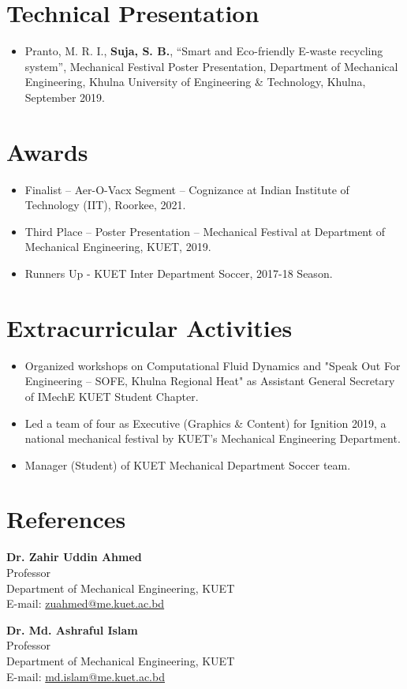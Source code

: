 \documentclass[letterpaper,11pt]{article}
\begin{document}
\section{Technical Presentation}
\begin{itemize}
\item Pranto, M. R. I., \textbf{Suja, S. B.}, “Smart and Eco-friendly E-waste recycling system”, Mechanical Festival Poster Presentation, Department of Mechanical Engineering, Khulna University of Engineering \& Technology, Khulna, September 2019.
\end{itemize}

\section{Awards}
\begin{itemize}
\item Finalist – Aer-O-Vacx Segment – Cognizance at Indian Institute of Technology (IIT), Roorkee, 2021.
\item Third Place – Poster Presentation – Mechanical Festival at Department of Mechanical Engineering, KUET, 2019.
\item Runners Up - KUET Inter Department Soccer, 2017-18 Season.
\end{itemize}

\section{Extracurricular Activities}
\begin{itemize}
\item Organized workshops on Computational Fluid Dynamics and "Speak Out For Engineering – SOFE, Khulna Regional Heat" as Assistant General Secretary of IMechE KUET Student Chapter.
\item Led a team of four as Executive (Graphics \& Content) for Ignition 2019, a national mechanical festival by KUET's Mechanical Engineering Department.
\item Manager (Student) of KUET Mechanical Department Soccer team.
\end{itemize}

\section{References}
\begin{minipage}[t]{0.45\textwidth}
\textbf{Dr. Zahir Uddin Ahmed} \\
Professor \\
Department of Mechanical Engineering, KUET \\
E-mail: \href{mailto:zuahmed@me.kuet.ac.bd}{zuahmed@me.kuet.ac.bd}\\
\end{minipage}
\hfill
\begin{minipage}[t]{0.45\textwidth}
\textbf{Dr. Md. Ashraful Islam} \\
Professor \\
Department of Mechanical Engineering, KUET \\
E-mail: \href{mailto:md.islam@me.kuet.ac.bd}{md.islam@me.kuet.ac.bd}
\end{minipage}
\end{document}
